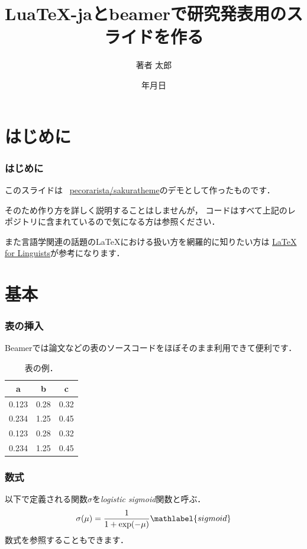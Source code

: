 \documentclass[%
    hyperref={%
        colorlinks,
        linkcolor=sDarkBlue,
        urlcolor=sDarkBlue,
        citecolor=sDarkBlue
    }
]{beamer}
\title{Lua\TeX{}-jaとbeamerで研究発表用のスライドを作る}
\institute{所属}
\author{著者 太郎}
\date{{\number\year}年{\number\month}月{\number\day}日}
\DeclareMathOperator{\exponential}{exp}
\newcommand\header[1]{\multicolumn{1}{c}{\textbf{#1}}}
\begin{document}
    \maketitle

    \section{はじめに}
    \begin{frame}
        \frametitle{はじめに}
        このスライドは \faGithub\ \href{https://github.com/pecorarista/sakuratheme}{\ttfamily pecorarista/sakuratheme}のデモとして作ったものです．

        \bigskip

        そのため作り方を詳しく説明することはしませんが，
        コードはすべて上記のレポジトリに含まれているので気になる方は参照ください．
        \bigskip

        また言語学関連の話題の\LaTeX における扱い方を網羅的に知りたい方は
        \href{https://www1.essex.ac.uk/linguistics/external/clmt/latex4ling/}
        {LaTeX for Linguists}が参考になります．
    \end{frame}

    \section{基本}
    \begin{frame}
        \frametitle{表の挿入}
        Beamerでは論文などの表のソースコードをほぼそのまま利用できて便利です．
        \begin{table}
            \centering
            \caption{表の例．}
            \begin{tabular}{rrr}
                \toprule
                \header{a} & \header{b} & \header{c} \\
                \midrule
                0.123 & 0.28  & 0.32 \\
                0.234 & 1.25  & 0.45 \\
                0.123 & 0.28  & 0.32 \\
                0.234 & 1.25  & 0.45 \\
                \bottomrule
            \end{tabular}
        \end{table}
    \end{frame}

    \begin{frame}
        \frametitle{数式}
        以下で定義される関数$\sigma$を\emph{logistic sigmoid}関数と呼ぶ\citep{prml}．
        \begin{align}
            \sigma(\mu) = \frac{1}{1 + \exponential(-\mu)} \mathlabel{sigmoid}
        \end{align}
        数式を参照することもできます．
    \end{frame}
\end{document}
